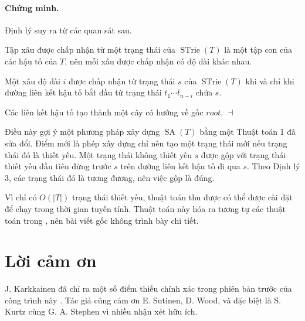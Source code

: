 \documentclass[11pt]{article}
\newenvironment{proof}{\paragraph{Chứng minh.}}{\hfill$\dashv$\par}
\newcommand{\STrie}{\operatorname{STrie}}
\newcommand{\SA}{\operatorname{SA}}
\begin{document}
\begin{proof}
Định lý suy ra từ các quan sát sau.

Tập xâu được chấp nhận từ một trạng thái của $\STrie(T)$ là một tập con của
các hậu tố của $T$, nên mỗi xâu được chấp nhận có độ dài khác nhau.

Một xâu độ dài $i$ được chấp nhận từ trạng thái $s$ của $\STrie(T)$ khi và
chỉ khi đường liên kết hậu tố bắt đầu từ trạng thái
$\overline{t_1\cdots t_{n-i}}$ chứa $s$.

Các liên kết hậu tố tạo thành một cây có hướng về gốc $\mathit{root}$.
\end{proof}

Điều này gợi ý một phương pháp xây dựng $\SA(T)$ bằng một Thuật toán 1 đã sửa
đổi. Điểm mới là phép xây dựng chỉ nên tạo một trạng thái mới nếu trạng thái
đó là thiết yếu. Một trạng thái không thiết yếu $s$ được gộp với trạng thái
thiết yếu đầu tiên đứng trước $s$ trên đường liên kết hậu tố đi qua $s$. Theo
Định lý 3, các trạng thái đó là tương đương, nên việc gộp là đúng.

Vì chỉ có $O(|T|)$ trạng thái thiết yếu, thuật toán thu được có thể được cài
đặt để chạy trong thời gian tuyến tính. Thuật toán này hóa ra tương tự các
thuật toán trong \cite{blumer,crochemore-transducers,crochemore-constraints},
nên bài viết gốc không trình bày chi tiết.

\section*{Lời cảm ơn}

J. Karkkainen đã chỉ ra một số điểm thiếu chính xác trong phiên bản trước của
công trình này \cite{ukkonen-ip92}. Tác giả cũng cảm ơn E. Sutinen, D. Wood,
và đặc biệt là S. Kurtz cùng G. A. Stephen vì nhiều nhận xét hữu ích.
\end{document}
